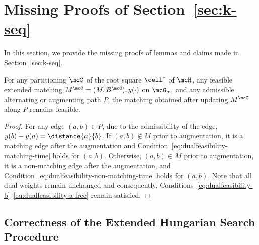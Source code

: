 \section{Missing Proofs of Section~\ref{sec:k-seq}}\label{sec:k-seq-appendix}

In this section, we provide the missing proofs of lemmas and claims made in Section~\ref{sec:k-seq}.

\begin{lemma}\label{lemma:augment}
    For any partitioning $\mcC$ of the root square $\cell^*$ of $\mcH$, any feasible extended matching $M^\mcC=(M, B^\mcC), y(\cdot)$ on $\mcG_\sigma$, and any admissible alternating or augmenting path $P$, the matching obtained after updating $M^\mcC$ along $P$ remains feasible.
\end{lemma}
\begin{proof}
    For any edge $(a,b)\in P$, due to the admissibility of the edge, $y(b)-y(a)=\distance{a}{b}$. If $(a,b)\notin M$ prior to augmentation, it is a matching edge after the augmentation and Condition~\eqref{eq:dualfeasibility-matching-time} holds for $(a,b)$. Otherwise, $(a,b)\in M$ prior to augmentation, it is a non-matching edge after the augmentation, and Condition~\eqref{eq:dualfeasibility-non-matching-time} holds for $(a,b)$. Note that all dual weights remain unchanged and consequently, Conditions~\eqref{eq:dualfeasibility-b}--\eqref{eq:dualfeasibility-a-free} remain satisfied.
\end{proof}



\subsection{Correctness of the Extended Hungarian Search Procedure}

\hungarianProp*



